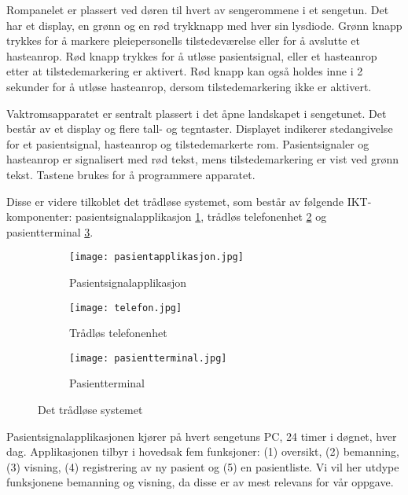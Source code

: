 \noindent
Rompanelet er plassert ved døren til hvert av sengerommene i et sengetun. Det har et display, en grønn og en rød trykknapp med hver sin lysdiode. Grønn knapp trykkes for å markere pleiepersonells tilstedeværelse eller for å avslutte et hasteanrop. Rød knapp trykkes for å utløse pasientsignal, eller et hasteanrop etter at tilstedemarkering er aktivert. Rød knapp kan også holdes inne i 2 sekunder for å utløse hasteanrop, dersom tilstedemarkering ikke er aktivert. 

\noindent
Vaktromsapparatet er sentralt plassert i det åpne landskapet i sengetunet. Det består av et display og flere tall- og tegntaster. Displayet indikerer stedangivelse for et pasientsignal, hasteanrop og tilstedemarkerte rom. Pasientsignaler og hasteanrop er signalisert med rød tekst, mens tilstedemarkering er vist ved grønn tekst. Tastene brukes for å programmere apparatet.

\noindent
Disse er videre tilkoblet det trådløse systemet, som består av følgende IKT-komponenter: pasientsignalapplikasjon \ref{pasientapplikasjon}, trådløs telefonenhet \ref{telefon} og pasientterminal \ref{pasientterminal}.

\begin{figure}[H]
        \centering
        \begin{subfigure}[b]{0.35\textwidth}
        		\centering
                \texttt{[image: pasientapplikasjon.jpg]}
                \caption{Pasientsignalapplikasjon}
                \label{pasientapplikasjon}
        \end{subfigure}%
        \begin{subfigure}[b]{0.35\textwidth}
        		\centering
                \texttt{[image: telefon.jpg]}
                \caption{Trådløs telefonenhet}
                \label{telefon}
        \end{subfigure}
        \begin{subfigure}[b]{0.25\textwidth}
        		\centering
                \texttt{[image: pasientterminal.jpg]}
                \caption{Pasientterminal}
                \label{pasientterminal}
        \end{subfigure}
        \caption{Det trådløse systemet}\label{dettradlosesystemet}
\end{figure}
\noindent
Pasientsignalapplikasjonen kjører på hvert sengetuns PC, 24 timer i døgnet, hver dag. Applikasjonen tilbyr i hovedsak fem funksjoner: (1) oversikt, (2) bemanning, (3) visning, (4) registrering av ny pasient og (5) en pasientliste. Vi vil her utdype funksjonene bemanning og visning, da disse er av mest relevans for vår oppgave.  

